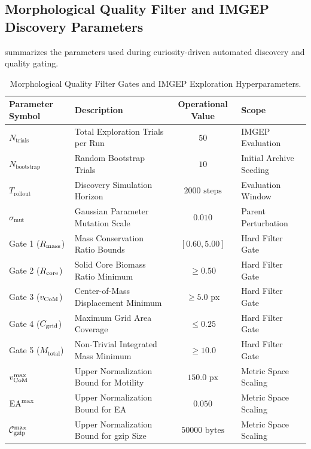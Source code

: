 \subsection{Morphological Quality Filter and IMGEP Discovery Parameters}
\label{subsec:app_param_imgep}

 summarizes the parameters used during curiosity-driven automated discovery and quality gating.

\begin{table}[htbp]
\centering
\footnotesize
\caption{Morphological Quality Filter Gates and IMGEP Exploration Hyperparameters.}
\label{tab:app_imgep_hyperparams}
\begin{tabularx}{\textwidth}{l X c p{3.4cm}}
\toprule
\textbf{Parameter Symbol} & \textbf{Description} & \textbf{Operational Value} & \textbf{Scope} \\
\midrule
$N_{\text{trials}}$ & Total Exploration Trials per Run & $50$ & IMGEP Evaluation \\
$N_{\text{bootstrap}}$ & Random Bootstrap Trials & $10$ & Initial Archive Seeding \\
$T_{\text{rollout}}$ & Discovery Simulation Horizon & $2000\text{ steps}$ & Evaluation Window \\
$\sigma_{\text{mut}}$ & Gaussian Parameter Mutation Scale & $0.010$ & Parent Perturbation \\
Gate 1 ($R_{\text{mass}}$) & Mass Conservation Ratio Bounds & $[0.60, 5.00]$ & Hard Filter Gate \\
Gate 2 ($R_{\text{core}}$) & Solid Core Biomass Ratio Minimum & $\ge 0.50$ & Hard Filter Gate \\
Gate 3 ($v_{\text{CoM}}$) & Center-of-Mass Displacement Minimum & $\ge 5.0\text{ px}$ & Hard Filter Gate \\
Gate 4 ($C_{\text{grid}}$) & Maximum Grid Area Coverage & $\le 0.25$ & Hard Filter Gate \\
Gate 5 ($M_{\text{total}}$) & Non-Trivial Integrated Mass Minimum & $\ge 10.0$ & Hard Filter Gate \\
$v_{\text{CoM}}^{\max}$ & Upper Normalization Bound for Motility & $150.0\text{ px}$ & Metric Space Scaling \\
$\text{EA}^{\max}$ & Upper Normalization Bound for EA & $0.050$ & Metric Space Scaling \\
$\mathcal{C}_{\text{gzip}}^{\max}$ & Upper Normalization Bound for gzip Size & $50000\text{ bytes}$ & Metric Space Scaling \\
\bottomrule
\end{tabularx}
\end{table}


